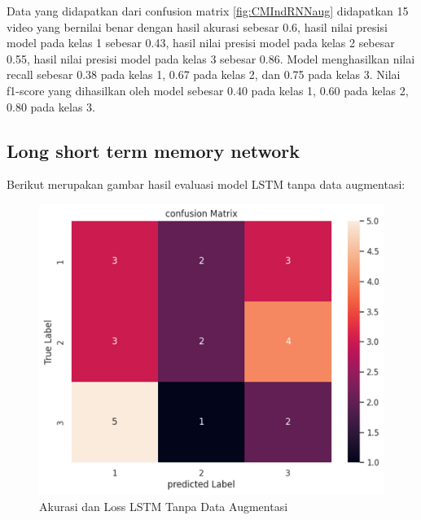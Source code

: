 Data yang didapatkan dari confusion matrix \ref{fig:CMIndRNNaug} didapatkan 15 video yang bernilai benar
dengan hasil akurasi sebesar 0.6, hasil nilai presisi model pada kelas 1 sebesar 0.43, hasil nilai
presisi model pada kelas 2 sebesar 0.55, hasil nilai presisi model pada kelas 3 sebesar 0.86. Model menghasilkan
nilai recall sebesar 0.38 pada kelas 1, 0.67 pada kelas 2, dan 0.75 pada kelas 3. Nilai f1-score yang dihasilkan
oleh model sebesar 0.40 pada kelas 1, 0.60 pada kelas 2, 0.80 pada kelas 3.

\subsection{Long short term memory network}

Berikut merupakan gambar hasil evaluasi model LSTM tanpa data augmentasi:
\newpage
\begin{figure} [H] \centering
  \includegraphics[scale=0.7]{gambar/CMLSTMnoAug.png}
  \caption{Akurasi dan Loss LSTM Tanpa Data Augmentasi}
  \label{fig:CMLSTMnoaug}
\end{figure}

